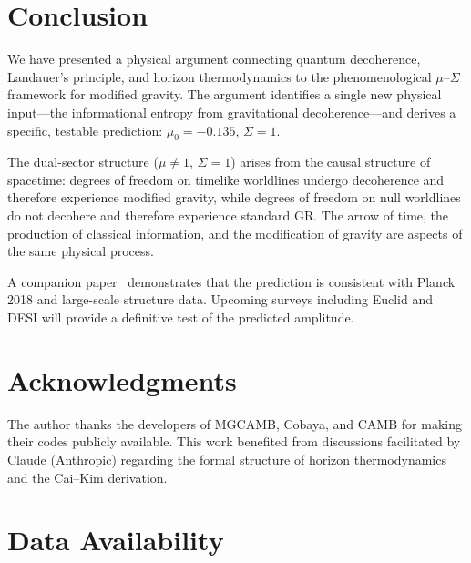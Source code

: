 \documentclass[11pt]{article}
\begin{document}
\section{Conclusion}
\label{sec:conclusion}

We have presented a physical argument connecting quantum decoherence,
Landauer's principle, and horizon thermodynamics to the phenomenological
$\mu$--$\Sigma$ framework for modified gravity.  The argument identifies a
single new physical input---the informational entropy from gravitational
decoherence---and derives a specific, testable prediction: $\mu_0 = -0.135$,
$\Sigma = 1$.

The dual-sector structure ($\mu \neq 1$, $\Sigma = 1$) arises from the
causal structure of spacetime: degrees of freedom on timelike worldlines
undergo decoherence and therefore experience modified gravity, while degrees
of freedom on null worldlines do not decohere and therefore experience
standard GR.  The arrow of time, the production of classical information,
and the modification of gravity are aspects of the same physical process.

A companion paper~\citep{Mahaffey2026obs} demonstrates that the prediction
is consistent with Planck 2018 and large-scale structure data.  Upcoming
surveys including Euclid and DESI will provide a definitive test of the
predicted amplitude.


\section*{Acknowledgments}

The author thanks the developers of MGCAMB, Cobaya, and CAMB for making
their codes publicly available.  This work benefited from discussions
facilitated by Claude (Anthropic) regarding the formal structure of horizon
thermodynamics and the Cai--Kim derivation.


\section*{Data Availability}
\end{document}
